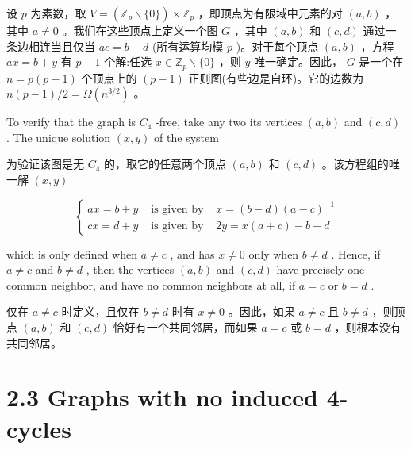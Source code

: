 \documentclass[10pt]{article}
\begin{document}
\begin{tcolorbox}\relax
设 \(p\) 为素数，取 \(V = \left( {{\mathbb{Z}}_{p}\smallsetminus \{ 0\} }\right)  \times  {\mathbb{Z}}_{p}\) ，即顶点为有限域中元素的对 \(\left( {a,b}\right)\) ，其中 \(a \neq  0\) 。我们在这些顶点上定义一个图 \(G\) ，其中 \(\left( {a,b}\right)\) 和 \(\left( {c,d}\right)\) 通过一条边相连当且仅当 \({ac} = b + d\) (所有运算均模 \(p\) )。对于每个顶点 \(\left( {a,b}\right)\) ，方程 \({ax} = b + y\) 有 \(p - 1\) 个解:任选 \(x \in  {\mathbb{Z}}_{p} \smallsetminus  \{ 0\}\) ，则 \(y\) 唯一确定。因此， \(G\) 是一个在 \(n = p\left( {p - 1}\right)\) 个顶点上的 \(\left( {p - 1}\right)\) 正则图(有些边是自环)。它的边数为 \(n\left( {p - 1}\right) /2 = \Omega \left( {n}^{3/2}\right)\) 。
\end{tcolorbox}

To verify that the graph is \({C}_{4}\) -free, take any two its vertices \(\left( {a,b}\right)\) and \(\left( {c,d}\right)\) . The unique solution \(\left( {x,y}\right)\) of the system

\begin{tcolorbox}\relax
为验证该图是无 \({C}_{4}\) 的，取它的任意两个顶点 \(\left( {a,b}\right)\) 和 \(\left( {c,d}\right)\) 。该方程组的唯一解 \(\left( {x,y}\right)\)
\end{tcolorbox}

\[
\left\{  \begin{array}{lll} {ax} = b + y & \text{ is given by } & x = \left( {b - d}\right) {\left( a - c\right) }^{-1} \\  {cx} = d + y & \text{ is given by } & {2y} = x\left( {a + c}\right)  - b - d \end{array}\right.
\]

which is only defined when \(a \neq  c\) , and has \(x \neq  0\) only when \(b \neq  d\) . Hence, if \(a \neq  c\) and \(b \neq  d\) , then the vertices \(\left( {a,b}\right)\) and \(\left( {c,d}\right)\) have precisely one common neighbor, and have no common neighbors at all, if \(a = c\) or \(b = d\) .

\begin{tcolorbox}\relax
仅在 \(a \neq  c\) 时定义，且仅在 \(b \neq  d\) 时有 \(x \neq  0\) 。因此，如果 \(a \neq  c\) 且 \(b \neq  d\) ，则顶点 \(\left( {a,b}\right)\) 和 \(\left( {c,d}\right)\) 恰好有一个共同邻居，而如果 \(a = c\) 或 \(b = d\) ，则根本没有共同邻居。
\end{tcolorbox}

\section*{2.3 Graphs with no induced 4-cycles}
\end{document}

